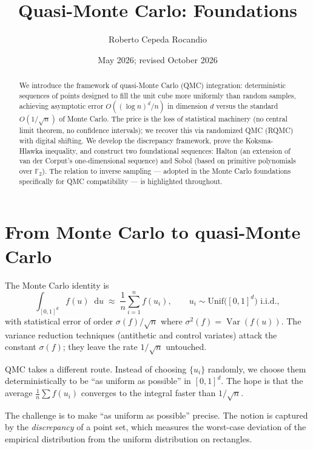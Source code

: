 \documentclass[11pt,a4paper]{article}
\title{Quasi-Monte Carlo: Foundations}
\author{Roberto Cepeda Rocandio}
\date{May 2026; revised October 2026}
\theoremstyle{plain}
\theoremstyle{definition}
\theoremstyle{remark}
\newcommand{\Var}{\operatorname{Var}}
\newcommand{\dd}{\mathop{}\!\mathrm{d}}
\begin{document}
\maketitle

\begin{abstract}
We introduce the framework of quasi-Monte Carlo (QMC) integration:
deterministic sequences of points designed to fill the unit cube
more uniformly than random samples, achieving asymptotic error
$O((\log n)^d / n)$ in dimension $d$ versus the standard
$O(1/\sqrt n)$ of Monte Carlo. The price is the loss of statistical
machinery (no central limit theorem, no confidence intervals); we
recover this via randomized QMC (RQMC) with digital shifting. We
develop the discrepancy framework, prove the Koksma-Hlawka
inequality, and construct two foundational sequences: Halton (an
extension of van der Corput's one-dimensional sequence) and Sobol
(based on primitive polynomials over $\mathbb{F}_2$). The relation
to inverse sampling --- adopted in the Monte Carlo foundations
specifically for QMC compatibility --- is highlighted throughout.
\end{abstract}

\tableofcontents

\section{From Monte Carlo to quasi-Monte Carlo}
\label{sec:mc-to-qmc}

The Monte Carlo identity is
\begin{equation}
\int_{[0,1]^d} f(u) \dd u \;\approx\; \frac{1}{n} \sum_{i=1}^n f(u_i),
\qquad u_i \sim \mathrm{Unif}\bigl([0,1]^d\bigr) \text{ i.i.d.},
\end{equation}
with statistical error of order $\sigma(f)/\sqrt n$ where
$\sigma^2(f) = \Var(f(u))$. The variance reduction techniques
(antithetic and control variates) attack the constant $\sigma(f)$; they
leave the rate $1/\sqrt n$ untouched.

QMC takes a different route. Instead of choosing $\{u_i\}$
randomly, we choose them deterministically to be ``as uniform as
possible'' in $[0,1]^d$. The hope is that the average $\frac{1}{n}
\sum f(u_i)$ converges to the integral faster than $1/\sqrt n$.

The challenge is to make ``as uniform as possible'' precise. The
notion is captured by the \emph{discrepancy} of a point set, which
measures the worst-case deviation of the empirical distribution
from the uniform distribution on rectangles.
\end{document}
